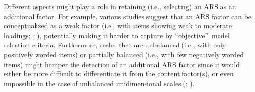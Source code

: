 \documentclass[a4paper,man,natbib]{apa6}
\begin{document}
\begin{linenumbers}
Different aspects might play a role in retaining (i.e., selecting) an ARS as an additional factor. For example, various studies suggest that an ARS factor can be conceptualized as a weak factor (i.e., with items showing weak to moderate loadings; \citealp*{ferrando2004convergent}; \citealp*{danner2015acquiescence}), potentially making it harder to capture by \textquotedblleft objective\textquotedblright\, model selection criteria. Furthermore, scales that are unbalanced (i.e., with only positively worded items) or partially balanced (i.e., with few negatively worded items) might hamper the detection of an additional ARS factor since it would either be more difficult to differentiate it from the content factor(s), or even impossible in the case of unbalanced unidimensional scales (\citealp{ferrando2010acquiescence}; \citealp{savalei2014recovering}).








\end{linenumbers}
\end{document}
